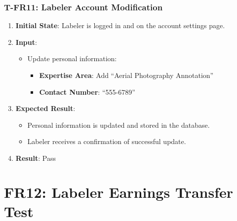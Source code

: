\documentclass[12pt, titlepage]{article}
\begin{document}
\subsubsection*{T-FR11: Labeler Account Modification}

\begin{enumerate}
    \item \textbf{Initial State}: Labeler is logged in and on the account settings page.
    \item \textbf{Input}:
    \begin{itemize}
        \item Update personal information:
        \begin{itemize}
            \item \textbf{Expertise Area}: Add ``Aerial Photography Annotation''
            \item \textbf{Contact Number}: ``555-6789''
        \end{itemize}
    \end{itemize}
        \item \textbf{Expected Result}:
        \begin{itemize}
            \item Personal information is updated and stored in the database.
            \item Labeler receives a confirmation of successful update.
        \end{itemize}
        \item \textbf{Result}: Pass
\end{enumerate}

\section*{FR12: Labeler Earnings Transfer Test}
\end{document}
